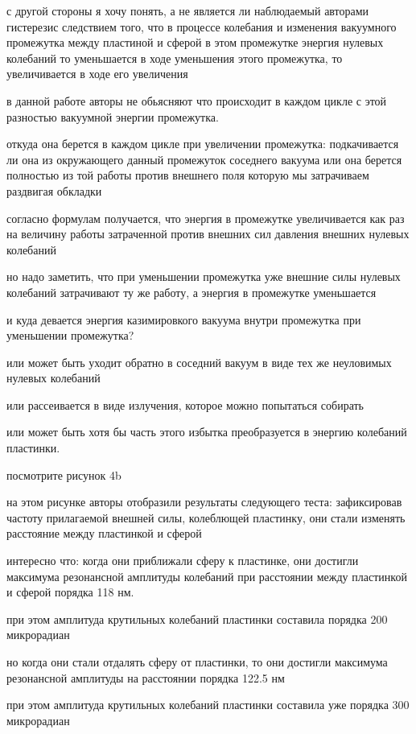 \documentclass[12pt, letterpaper]{article}
\begin{document}
с другой стороны я хочу понять, а не является ли наблюдаемый авторами гистерезис следствием того, что в процессе колебания и изменения вакуумного промежутка между пластиной и сферой в этом промежутке энергия нулевых колебаний то уменьшается в ходе уменьшения этого промежутка, то увеличивается в ходе его увеличения

в данной работе авторы не обьясняют что происходит в каждом цикле с этой разностью вакуумной энергии промежутка.

откуда она берется в каждом цикле при увеличении промежутка: подкачивается ли она из окружающего данный промежуток соседнего вакуума или она берется полностью из той работы против внешнего поля которую мы затрачиваем раздвигая обкладки

согласно формулам получается, что энергия в промежутке увеличивается как раз на величину работы затраченной против внешних сил давления внешних нулевых колебаний

но надо заметить, что при уменьшении промежутка уже внешние силы нулевых колебаний затрачивают ту же работу, а энергия в промежутке уменьшается

и куда девается энергия казимировкого вакуума внутри промежутка при уменьшении промежутка?

или может быть уходит обратно в соседний вакуум в виде тех же неуловимых нулевых колебаний

или рассеивается в виде излучения, которое можно попытаться собирать

или может быть хотя бы часть этого избытка преобразуется в энергию колебаний пластинки.

посмотрите рисунок 4b

на этом рисунке авторы отобразили результаты следующего теста: зафиксировав частоту прилагаемой внешней силы, колеблющей пластинку, они стали изменять расстояние между пластинкой и сферой

интересно что: когда они приближали сферу к пластинке, они достигли максимума резонансной амплитуды колебаний при расстоянии между пластинкой и сферой порядка 118 нм.

при этом амплитуда крутильных колебаний пластинки составила порядка 200 микрорадиан

но когда они стали отдалять сферу от пластинки, то они достигли максимума резонансной амплитуды на расстоянии порядка 122.5 нм

при этом амплитуда крутильных колебаний пластинки составила уже порядка 300 микрорадиан
\end{document}
